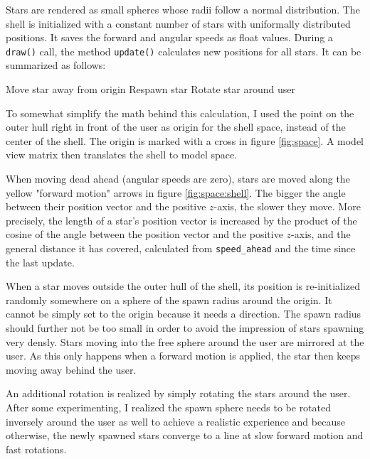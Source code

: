 \documentclass[hyperref, bachelorofscience]{cgvpub}
\begin{document}
\newpage
Stars are rendered as small spheres whose radii follow a normal distribution. The shell is initialized with a constant number of stars with uniformally distributed positions. It saves the forward and angular speeds as float values. During a \lstinline|draw()| call, the method \lstinline|update()| calculates new positions for all stars. It can be summarized as follows:

\begin{algorithmic}
			\State Move star away from origin
				\State Respawn star
			\Else
				\State Rotate star around user
			\EndIf
		\EndFor
\end{algorithmic}

To somewhat simplify the math behind this calculation, I used the point on the outer hull right in front of the user as origin for the shell space, instead of the center of the shell. The origin is marked with a cross in figure \ref{fig:space}. A model view matrix then translates the shell to model space. 

When moving dead ahead (angular speeds are zero), stars are moved along the yellow "forward motion" arrows in figure \ref{fig:space:shell}. The bigger the angle between their position vector and the positive $ z $-axis, the slower they move. More precisely, the length of a star's position vector is increased by the product of the cosine of the angle between the position vector and the positive $ z $-axis, and the general distance it has covered, calculated from \lstinline|speed_ahead| and the time since the last update.

When a star moves outside the outer hull of the shell, its position is re-initialized randomly somewhere on a sphere of the spawn radius around the origin. It cannot be simply set to the origin because it needs a direction. The spawn radius should further not be too small in order to avoid the impression of stars spawning very densly. Stars moving into the free sphere around the user are mirrored at the user. As this only happens when a forward motion is applied, the star then keeps moving away behind the user.

An additional rotation is realized by simply rotating the stars around the user. After some experimenting, I realized the spawn sphere needs to be rotated inversely around the user as well to achieve a realistic experience and because otherwise, the newly spawned stars converge to a line at slow forward motion and fast rotations.
\end{document}
